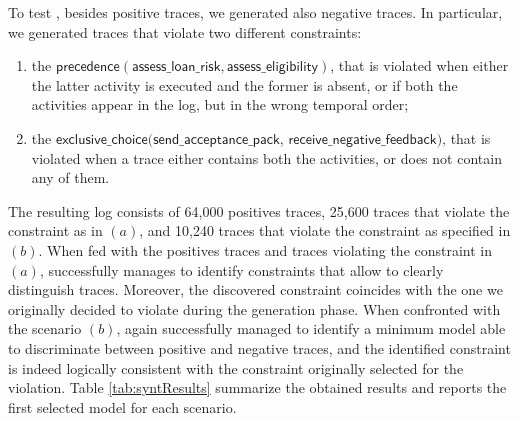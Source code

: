 To test \nd, besides positive traces, we generated also negative traces. In particular, we generated traces that violate two different constraints:
\begin{enumerate}[label=(\textit{\alph*})]
\item the $\mathsf{precedence(assess\_loan\_risk, assess\_eligibility)}$, that is violated when either the latter activity is executed and the former is absent, or if both the activities appear in the log, but in the wrong temporal order;
%
\item the $\mathsf{exclusive\_choice(send\_acceptance\_pack}$, $\mathsf{receive\_negative\_feedback)}$, that is violated when a trace either contains both the activities, or does not contain any of them.
\end{enumerate}
%
The resulting log consists of 64,000 positives traces, 25,600 traces that violate the constraint as in $(a)$, and 10,240 traces that violate the constraint as specified in $(b)$.
%
When fed with the positives traces and traces violating the constraint in $(a)$, \nd successfully manages to identify constraints that allow to clearly distinguish traces. Moreover, the discovered constraint coincides with the one we originally decided to violate during the generation phase. When confronted with the scenario $(b)$, \nd again successfully managed to identify a minimum model able to discriminate between positive and negative traces, and the identified constraint is indeed logically consistent with the constraint originally selected for the violation.
Table \ref{tab:syntResults} summarize the obtained results and reports the first selected model for each scenario.


